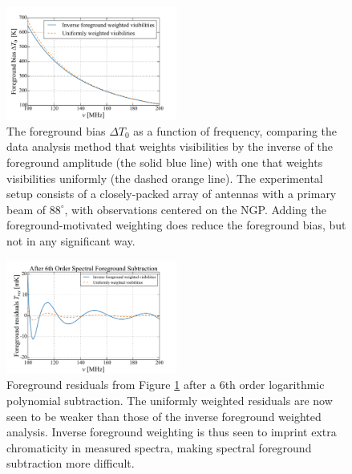 \documentclass[twocolumn,apj,numberedappendix]{emulateapj}
\begin{document}
\begin{figure}[h]
	\centering
	\includegraphics[width=0.50\textwidth]{figures/NcomparisonNoSub.pdf}
	\caption{The foreground bias $\Delta T_0$ as a function of frequency, comparing the data analysis method that weights visibilities by the inverse of the foreground amplitude (the solid blue line) with one that weights visibilities uniformly (the dashed orange line). The experimental setup consists of a closely-packed array of antennas with a primary beam of $88^\circ$, with observations centered on the NGP. Adding the foreground-motivated weighting does reduce the foreground bias, but not in any significant way.}
	\label{fig:Ncomparison}
\end{figure}

\begin{figure}[h]
	\centering
	\includegraphics[width=0.50\textwidth]{figures/NcomparisonPoly6.pdf}
	\caption{Foreground residuals from Figure \ref{fig:Ncomparison} after a $6$th order logarithmic polynomial subtraction. The uniformly weighted residuals are now seen to be weaker than those of the inverse foreground weighted analysis. Inverse foreground weighting is thus seen to imprint extra chromaticity in measured spectra, making spectral foreground subtraction more difficult.}
	\label{fig:NcomparisonPoly6}
\end{figure}
\end{document}
